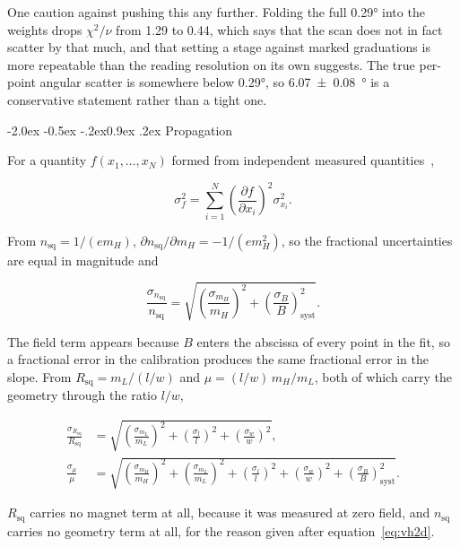 \documentclass[11pt,a4paper]{article}
\makeatletter
\renewcommand\subsection{\@startsection{subsection}{2}{\z@}%
  {-2.0ex \@plus -0.5ex \@minus -.2ex}{0.9ex \@plus .2ex}%
  {\normalfont\normalsize\bfseries}}
\newcommand{\Rsq}{R_{\mathrm{sq}}}
\newcommand{\nsq}{n_{\mathrm{sq}}}
\makeatother
\begin{document}
One caution against pushing this any further. Folding the full \ang{0.29} into the weights
drops $\chi^2/\nu$ from \num{1.29} to \num{0.44}, which says that the scan does not in fact
scatter by that much, and that setting a stage against marked graduations is more repeatable
than the reading resolution on its own suggests. The true per-point angular scatter is
somewhere below \ang{0.29}, so \qty{6.07(8)}{\degree} is a conservative statement rather than a
tight one.

\subsection{Propagation}

For a quantity $f(x_1,\dots,x_N)$ formed from independent measured
quantities~\cite{taylor1997},

\begin{equation}
\sigma_f^2 = \sum_{i=1}^{N}\left(\frac{\partial f}{\partial x_i}\right)^2 \sigma_{x_i}^2 .
\label{eq:prop}
\end{equation}

From $\nsq = 1/(e m_H)$, $\partial \nsq/\partial m_H = -1/(e m_H^2)$, so the fractional
uncertainties are equal in magnitude and

\begin{equation}
\frac{\sigma_{\nsq}}{\nsq} = \sqrt{
\left(\frac{\sigma_{m_H}}{m_H}\right)^2 +
\left(\frac{\sigma_B}{B}\right)^2_{\mathrm{syst}} } .
\label{eq:propn}
\end{equation}

The field term appears because $B$ enters the abscissa of every point in the fit, so a
fractional error in the calibration produces the same fractional error in the slope. From
$\Rsq = m_L/(l/w)$ and $\mu = (l/w)\,m_H/m_L$, both of which carry the geometry through the
ratio $l/w$,

\begin{align}
\frac{\sigma_{\Rsq}}{\Rsq} &= \sqrt{
\left(\frac{\sigma_{m_L}}{m_L}\right)^2 +
\left(\frac{\sigma_l}{l}\right)^2 +
\left(\frac{\sigma_w}{w}\right)^2 } ,
\label{eq:proprsq}\\[2pt]
\frac{\sigma_{\mu}}{\mu} &= \sqrt{
\left(\frac{\sigma_{m_H}}{m_H}\right)^2 +
\left(\frac{\sigma_{m_L}}{m_L}\right)^2 +
\left(\frac{\sigma_l}{l}\right)^2 +
\left(\frac{\sigma_w}{w}\right)^2 +
\left(\frac{\sigma_B}{B}\right)^2_{\mathrm{syst}} } .
\label{eq:propmu}
\end{align}

$\Rsq$ carries no magnet term at all, because it was measured at zero field, and $\nsq$
carries no geometry term at all, for the reason given after equation~\eqref{eq:vh2d}.
\end{document}
